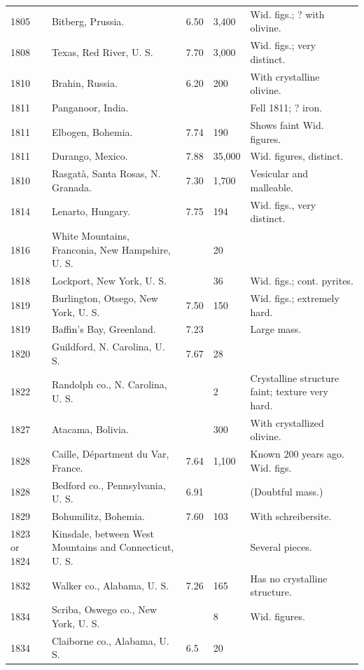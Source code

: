 \documentclass[a4paper, 12pt, oneside]{article}
\begin{document}
\begin{center}
\begin{longtable}{|p{16mm}|p{34mm}|p{10mm}|p{12mm}|p{40mm}|}
        1805 & Bitberg, Prussia. & 6.50 & 3,400 & Wid. figs.; ? with olivine. \\
        1808 & Texas, Red River, U. S. & 7.70 & 3,000 & Wid. figs.; very distinct. \\
        1810 & Brahin, Russia. & 6.20 & 200 & With crystalline olivine. \\
        1811 & Panganoor, India. & ~ & ~ & Fell 1811; ? iron. \\
        1811 & Elbogen, Bohemia. & 7.74 & 190 & Shows faint Wid. figures. \\
        1811 & Durango, Mexico. & 7.88 & 35,000 & Wid. figures, distinct. \\
        1810 & Rasgatà, Santa Rosas, N. Granada. & 7.30 & 1,700 & Vesicular and malleable. \\
        1814 & Lenarto, Hungary. & 7.75 & 194 & Wid. figs., very distinct. \\
        1816 & White Mountains, Franconia, New Hampshire, U. S. & ~ & 20 & ~ \\
        1818 & Lockport, New York, U. S. & ~ & 36 & Wid. figs.; cont. pyrites. \\
        1819 & Burlington, Otsego, New York, U. S. & 7.50 & 150 & Wid. figs.; extremely hard. \\
        1819 & Baffin’s Bay, Greenland. & 7.23 & ~ & Large mass. \\
        1820 & Guildford, N. Carolina, U. S. & 7.67 & 28 & ~ \\
        1822 & Randolph co., N. Carolina, U. S. & ~ & 2 & Crystalline structure faint; texture very hard. \\
        1827 & Atacama, Bolivia. & ~ & 300 & With crystallized olivine. \\
        1828 & Caille, Départment du Var, France. & 7.64 & 1,100 & Known 200 years ago. Wid. figs. \\
        1828 & Bedford co., Pennsylvania, U. S. & 6.91 & ~ & (Doubtful mass.) \\
        1829 & Bohumilitz, Bohemia. & 7.60 & 103 & With schreibersite. \\
        1823 or 1824 & Kinsdale, between West Mountains and Connecticut, U. S. & ~ & ~ & Several pieces. \\
        1832 & Walker co., Alabama, U. S. & 7.26 & 165 & Has no crystalline structure. \\
        1834 & Scriba, Oswego co., New York, U. S. & ~ & 8 & Wid. figures. \\
        1834 & Claiborne co., Alabama, U. S. & 6.5 & 20 & ~ \\

\end{longtable}
\end{center}
\end{document}
